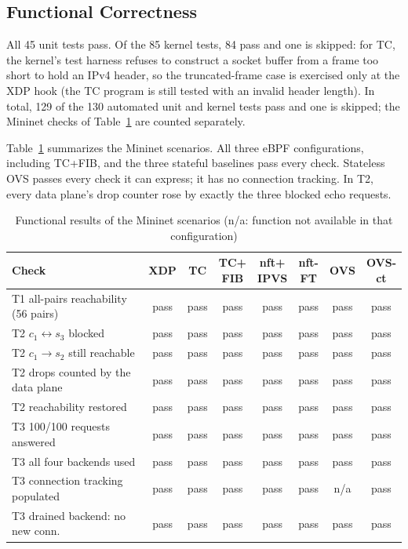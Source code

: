 \documentclass[conference]{IEEEtran}
\begin{document}
\subsection{Functional Correctness}
All 45 unit tests pass. Of the 85 kernel tests, 84 pass and one is skipped:
for TC, the kernel's test harness refuses to construct a socket buffer from a
frame too short to hold an IPv4 header, so the truncated-frame case is
exercised only at the XDP hook (the TC program is still tested with an
invalid header length). In total, 129 of the 130 automated unit and kernel
tests pass and one is skipped; the Mininet checks of Table~\ref{tab:correct}
are counted separately.

Table~\ref{tab:correct} summarizes the Mininet scenarios. All three eBPF
configurations, including TC+FIB, and the three stateful baselines pass every
check. Stateless OVS passes every check it can express; it has no connection
tracking. In T2, every data plane's drop counter rose by exactly the three
blocked echo requests.

\begin{table}[t]
\caption{Functional results of the Mininet scenarios (n/a: function not
available in that configuration)}
\label{tab:correct}
\centering\scriptsize
\setlength{\tabcolsep}{1.6pt}
\begin{tabular}{@{}lccccccc@{}}
\toprule
Check & XDP & TC & \shortstack{TC+\\FIB} & \shortstack{nft+\\IPVS} & \shortstack{nft-\\FT} & OVS & \shortstack{OVS-\\ct} \\
\midrule
T1 all-pairs reachability (56 pairs) & pass & pass & pass & pass & pass & pass & pass \\
T2 $c_1 \leftrightarrow s_3$ blocked & pass & pass & pass & pass & pass & pass & pass \\
T2 $c_1 \to s_2$ still reachable & pass & pass & pass & pass & pass & pass & pass \\
T2 drops counted by the data plane & pass & pass & pass & pass & pass & pass & pass \\
T2 reachability restored & pass & pass & pass & pass & pass & pass & pass \\
T3 100/100 requests answered & pass & pass & pass & pass & pass & pass & pass \\
T3 all four backends used & pass & pass & pass & pass & pass & pass & pass \\
T3 connection tracking populated & pass & pass & pass & pass & pass & n/a & pass \\
T3 drained backend: no new conn. & pass & pass & pass & pass & pass & pass & pass \\
\bottomrule
\end{tabular}
\end{table}
\end{document}
